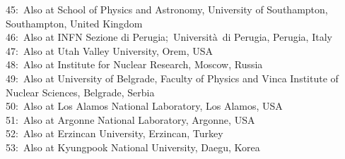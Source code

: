 $$45:~Also at School of Physics and Astronomy, University of Southampton, Southampton, United Kingdom\\
46:~Also at INFN Sezione di Perugia;~Universit\`{a}~di Perugia, Perugia, Italy\\
47:~Also at Utah Valley University, Orem, USA\\
48:~Also at Institute for Nuclear Research, Moscow, Russia\\
49:~Also at University of Belgrade, Faculty of Physics and Vinca Institute of Nuclear Sciences, Belgrade, Serbia\\
50:~Also at Los Alamos National Laboratory, Los Alamos, USA\\
51:~Also at Argonne National Laboratory, Argonne, USA\\
52:~Also at Erzincan University, Erzincan, Turkey\\
53:~Also at Kyungpook National University, Daegu, Korea\\

